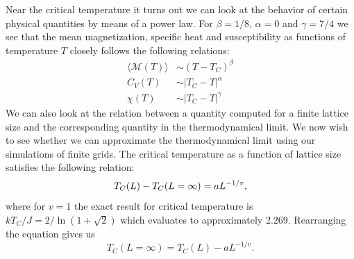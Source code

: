 Near the critical temperature it turns out we can look at the behavior of certain physical quantities by means of a power law.
For $\beta = 1/8$, $\alpha = 0$ and $\gamma = 7/4$ we see that the mean magnetization, specific heat and susceptibility as functions of temperature $T$ closely follows the following relations:
\begin{align*}
  \langle \mathcal{M}(T) \rangle &\sim \left( T - T_C \right)^\beta \\
  C_V(T) &\sim \left| T_C - T \right|^\alpha \\
  \chi(T) &\sim \left|T_C - T\right|^\gamma
\end{align*}
We can also look at the relation between a quantity computed for a finite
lattice size and the corresponding quantity in the thermodynamical limit. We
now wish to see whether we can approximate the thermodynamical limit using our
simulations of finite grids. The critical temperature as a function of lattice
size satisfies the following relation:
\begin{equation}
  \notag
  T_C(L) - T_C(L = \infty) = aL^{-1/v},
\end{equation}
where for $v = 1$ the exact result for critical temperature is ${kT_C/J = 2 /
\ln(1+\sqrt{2})}$ which evaluates to approximately 2.269. Rearranging the equation gives us
\begin{equation}
  T_C(L = \infty) = T_C(L) - aL^{-1/v}.
\end{equation}

